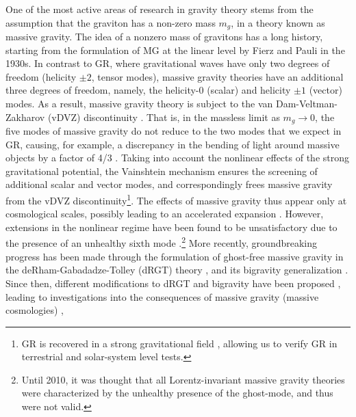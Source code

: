 \documentclass[prd,twocolumn,aps,psfig,nofootinbib,nobibnotes,superscriptaddress,preprintnumbers,times]{revtex4-2}
\begin{document}
One of the most active areas of research in gravity theory stems from the assumption that the graviton has a non-zero mass $m_g$, in a theory known as massive gravity. The idea of a nonzero mass of gravitons has a long history, starting from the formulation of MG at the linear level by Fierz and Pauli \cite{Fierz:1939ix} in the 1930s. In contrast to GR, where gravitational waves have only two degrees of freedom (helicity $\pm 2$, tensor modes), massive gravity theories have an additional three degrees of freedom, namely, the helicity-$0$ (scalar) and helicity $\pm 1$ (vector) modes. As a result, massive gravity theory is subject to the van Dam-Veltman-Zakharov (vDVZ) discontinuity \cite{vanDam:1970vg,Zakharov:1970cc}. That is, in the massless limit as $m_g \rightarrow 0$, the five modes of massive gravity do not reduce to the two modes that we expect in GR, causing, for example, a discrepancy in the bending of light around massive objects by a factor of 4/3 \cite{vanDam:1970vg}. Taking into account the nonlinear effects of the strong gravitational potential, the Vainshtein mechanism \cite{Vainshtein:1972sx} ensures the screening of additional scalar and vector modes, and correspondingly frees massive gravity from the vDVZ discontinuity\footnote{GR is recovered in a strong gravitational field \cite{Tasinato:2013rza}, allowing us to verify GR in terrestrial and solar-system level tests.}. The effects of massive gravity thus appear only at
cosmological scales, possibly leading to an accelerated expansion \cite{Tasinato:2012ze}.
However, extensions in the nonlinear regime have been found to be unsatisfactory due to the presence of an unhealthy sixth mode \cite{Boulware:1972yco}.\footnote{Until 2010, it was thought that all Lorentz-invariant massive gravity theories were characterized by the unhealthy presence of the ghost-mode, and thus were not valid. }
More recently, groundbreaking progress has been made through the formulation of ghost-free massive gravity in the deRham-Gabadadze-Tolley (dRGT) theory \cite{deRham:2010ik,deRham:2010kj}, and its bigravity generalization \cite{Hassan:2011zd}. Since then, different modifications to dRGT and bigravity have been proposed \cite{Hinterbichler:2011tt,deRham:2014zqa,Koyama:2015vza,deRham:2016nuf,Hinterbichler:2016try, Cusin:2016ytz}, leading to investigations into the consequences of massive gravity (massive cosmologies) 
\cite{DAmico:2011eto,Gratia:2012wt,Gumrukcuoglu:2012aa,Maeda:2013bha,Akrami:2013pna,Zhang:2013noa,Lambiase:2012fv,Koyama:2011wx,Tasinato:2012ze,Solomon:2014iwa, Akrami:2013ffa,Koennig:2014ods,Gumrukcuoglu:2016hic}, 
\end{document}
